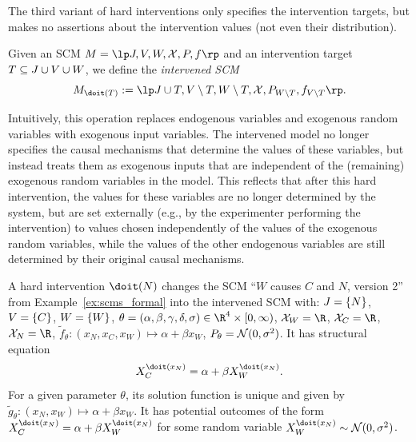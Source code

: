The third variant of hard interventions only specifies the intervention targets, but makes
no assertions about the intervention values (not even their distribution).
\begin{Def}\label{def:scm_hard_intervention_unspecified}
  Given an SCM $M = \lt \Sin, \Send, \Srnd, \CX, P, f \rt$
  and an intervention target $T \subseteq J \cup V \cup W$, we define the \emph{intervened SCM}
  $$M_{\doit(T)} := \lt \Sin \cup T,\Send \setminus T,\Srnd \setminus T,\CX,P_{\Srnd\setminus T},f_{\Send\setminus T} \rt.$$
\end{Def}
Intuitively, this operation replaces endogenous variables and exogenous random variables with exogenous input variables.
The intervened model no longer specifies the causal mechanisms that determine the values of these variables, 
but instead treats them as exogenous inputs that are independent of the (remaining) exogenous random variables in the model. 
This reflects that after this hard intervention, the values for
these variables are no longer determined by the system, but are set externally (e.g., by the 
experimenter performing the intervention) to values chosen independently of the values of the exogenous
random variables, while the values of the other endogenous variables are still
determined by their original causal mechanisms.
\begin{Eg}
  A hard intervention $\doit(N)$ changes the SCM ``$W$ causes $C$ and $N$, version 2'' from Example~\ref{ex:scms_formal} 
  into the intervened SCM with:
  $J = \{N\}$, $V = \{C\}$, $W = \{W\}$, $\theta = (\alpha,\beta,\gamma,\delta,\sigma) \in \RN^4 \times [0,\infty)$, 
  $\C{X}_W = \RN$, $\C{X}_C = \RN$, $\C{X}_N = \RN$, $\tilde{f}_\theta : (x_N, x_C, x_W) \mapsto \alpha + \beta x_W$, $P_\theta = \mathcal{N}(0,\sigma^2)$.
  It has structural equation
  $$X_C^{\doit(x_N)} = \alpha + \beta X_W^{\doit(x_N)}.$$
  For a given parameter $\theta$, its solution function is unique and given by $\tilde{g}_\theta : (x_N, x_W) \mapsto \alpha + \beta x_W$. 
  It has potential outcomes of the form $X_C^{\doit(x_N)} = \alpha + \beta X^{\doit(x_N)}_W$ for some random variable $X_W^{\doit(x_N)} \sim \C{N}(0,\sigma^2)$. 
\end{Eg}

